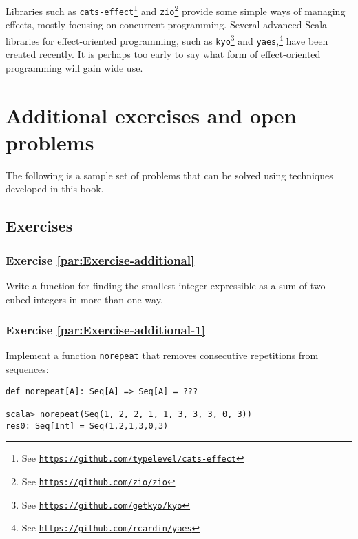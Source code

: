 Libraries such as \lstinline!cats-effect!\footnote{See \texttt{\href{https://github.com/typelevel/cats-effect}{https://github.com/typelevel/cats-effect}}}
and \lstinline!zio!\footnote{See \texttt{\href{https://github.com/zio/zio}{https://github.com/zio/zio}}}
provide some simple ways of managing effects, mostly focusing on concurrent
programming. Several advanced Scala libraries for effect-oriented
programming, such as \lstinline!kyo!\footnote{See \texttt{\href{https://github.com/getkyo/kyo}{https://github.com/getkyo/kyo}}}
and \lstinline!yaes!,\footnote{See \texttt{\href{https://github.com/rcardin/yaes}{https://github.com/rcardin/yaes}}}
have been created recently. It is perhaps too early to say what form
of effect-oriented programming will gain wide use.

\section{Additional exercises and open problems\label{chap:Exercises-in-AFTT}}

The following is a sample set of problems that can be solved using
techniques developed in this book.

\subsection{Exercises}

\subsubsection{Exercise \label{par:Exercise-additional}\ref{par:Exercise-additional}}

Write a function for finding the smallest integer expressible as a
sum of two cubed integers in more than one way.

\subsubsection{Exercise \label{par:Exercise-additional-1}\ref{par:Exercise-additional-1}}

Implement a function \lstinline!norepeat! that removes consecutive
repetitions from sequences:
\begin{lstlisting}
def norepeat[A]: Seq[A] => Seq[A] = ???

scala> norepeat(Seq(1, 2, 2, 1, 1, 3, 3, 3, 0, 3))
res0: Seq[Int] = Seq(1,2,1,3,0,3)
\end{lstlisting}


